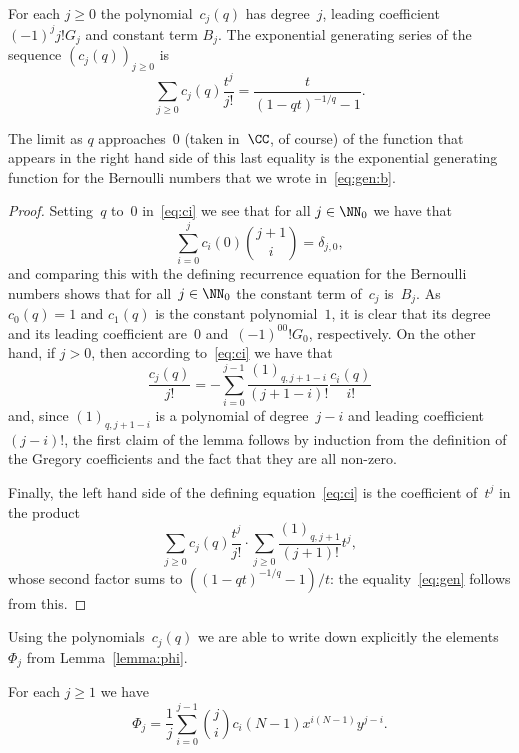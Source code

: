 \begin{Lemma}\label{lemma:cj}
For each $j\geq0$ the polynomial~$c_j(q)$ has degree~$j$, leading
coefficient $(-1)^jj!G_j$ and constant term $B_j$.
The exponential generating series of the sequence $(c_j(q))_{j\geq0}$ is
  \[ \label{eq:gen}
  \sum_{j\geq0}c_j(q)\frac{t^j}{j!} = \frac{t}{(1-qt)^{-1/q}-1}.
  \]
\end{Lemma}

The limit as $q$ approaches~$0$ (taken in~$\CC$, of course) of the function
that appears in the right hand side of this last equality is the
exponential generating function for the Bernoulli numbers that we wrote
in~\eqref{eq:gen:b}.

\begin{proof}
Setting~$q$ to~$0$ in~\eqref{eq:ci} we see that for all $j\in\NN_0$ we have
that
  \[
  \sum_{i=0}^j c_i(0)\binom{j+1}{i} = \delta_{j,0},
  \]
and comparing this with the defining recurrence equation for the Bernoulli
numbers shows that for all~$j\in\NN_0$ the constant term of~$c_j$ is~$B_j$.
As $c_0(q)=1$ and $c_1(q)$ is the constant polynomial~$1$, it is clear that
its degree and its leading coefficient are~$0$ and~$(-1)^00!G_0$,
respectively. On the other hand, if $j>0$, then according to~\eqref{eq:ci}
we have that
  \[
  \frac{c_j(q)}{j!} 
    = -\sum_{i=0}^{j-1} \frac{(1)_{q,j+1-i}}{(j+1-i)!}\frac{c_i(q)}{i!}
  \]
and, since $(1)_{q,j+1-i}$ is a polynomial of degree~$j-i$ and leading
coefficient~$(j-i)!$, the first claim of the lemma follows by induction
from the definition of the Gregory coefficients and the fact that they are
all non-zero.

Finally, the left hand side of the defining equation~\eqref{eq:ci} is the
coefficient of~$t^j$ in the product
  \[
  \sum_{j\geq0}c_j(q)\frac{t^j}{j!}
  \cdot
  \sum_{j\geq0}\frac{(1)_{q,j+1}}{(j+1)!}t^j,
  \]
whose second factor sums to $((1-qt)^{-1/q}-1)/t$: the
equality~\eqref{eq:gen} follows from this.
\end{proof}

Using the polynomials~$c_j(q)$ we are able to write down explicitly the
elements~$\Phi_j$ from Lemma~\ref{lemma:phi}.

\begin{Proposition}\mbox{}\label{prop:phi}
For each $j\geq1$ we have 
  \[ \label{eq:psi}
  \Phi_j = 
        \frac{1}{j}
        \sum_{i=0}^{j-1}
        \binom{j}{i}
        c_i(N-1)
        x^{i(N-1)}y^{j-i}.
  \]
\end{Proposition}

